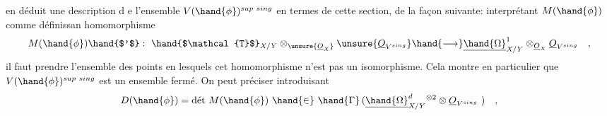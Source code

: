 en déduit une description d e l'ensemble $V(\hand{\phi})^{sup\ sing}$ en termes de
cette section, de la façon suivante: interprétant $M(\hand{\phi})$ comme définissan
homomorphisme
\[
M(\hand{\phi})\hand{$'$} : \ \hand{$\mathcal{T}$}_{X/Y} \otimes_{\unsure{\underline{O}_X}} \unsure{\underline{O}_{V^{sing}}} \hand{\longrightarrow} \underline{\hand{\Omega}}^1_{X/Y} \otimes_{\underline{O}_X} \underline{O}_{V^{sing}} \quad ,
\]
il faut prendre l'ensemble des points en lesquels cet homomorphisme
n'est pas un isomorphisme. Cela montre en particulier que $V(\hand{\phi})^{sup\ sing}$
est un ensemble fermé. On peut  préciser  introduisant
\[
D(\hand{\phi}) = \text{dét}\ M(\hand{\phi}) \ \hand{\in} \ \hand{\Gamma}\,(\underline{\hand{\Omega}}^d_{X/Y}{}^{\otimes 2} \otimes \underline{O}_{V^{sing}}\ ) \quad ,
\]

